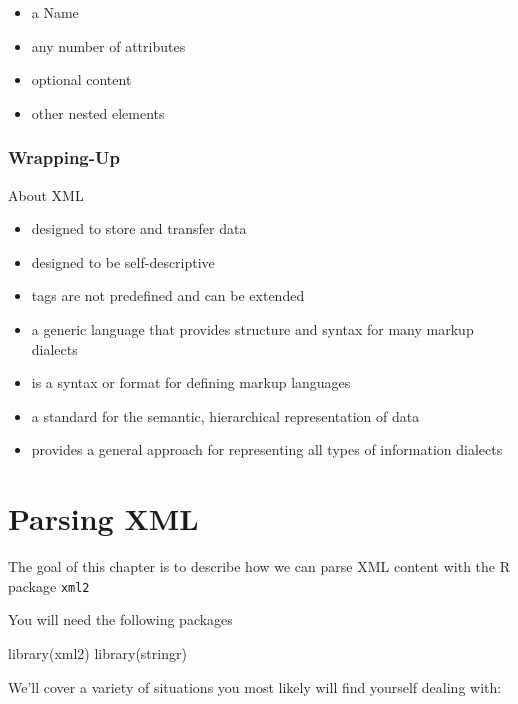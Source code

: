 \documentclass[
]{book}
\newenvironment{Shaded}{\begin{snugshade}}{\end{snugshade}}
\newcommand{\FunctionTok}[1]{\textcolor[rgb]{0.00,0.00,0.00}{#1}}
\newcommand{\NormalTok}[1]{#1}
\providecommand{\tightlist}{%
  \setlength{\itemsep}{0pt}\setlength{\parskip}{0pt}}
\begin{document}
\begin{itemize}
\tightlist
\item
  a Name
\item
  any number of attributes
\item
  optional content
\item
  other nested elements
\end{itemize}

\hypertarget{wrapping-up}{%
\subsection{Wrapping-Up}\label{wrapping-up}}

About XML

\begin{itemize}
\tightlist
\item
  designed to store and transfer data
\item
  designed to be self-descriptive
\item
  tags are not predefined and can be extended
\item
  a generic language that provides structure and syntax for many markup dialects
\item
  is a syntax or format for defining markup languages
\item
  a standard for the semantic, hierarchical representation of data
\item
  provides a general approach for representing all types of information dialects
\end{itemize}

\hypertarget{parsing-xml}{%
\chapter{Parsing XML}\label{parsing-xml}}

The goal of this chapter is to describe how we can parse XML content
with the R package \texttt{xml2}

You will need the following packages

\begin{Shaded}
\begin{Highlighting}[]
\FunctionTok{library}\NormalTok{(xml2)}
\FunctionTok{library}\NormalTok{(stringr)}
\end{Highlighting}
\end{Shaded}

We'll cover a variety of situations you most likely will find yourself dealing
with:
\end{document}
